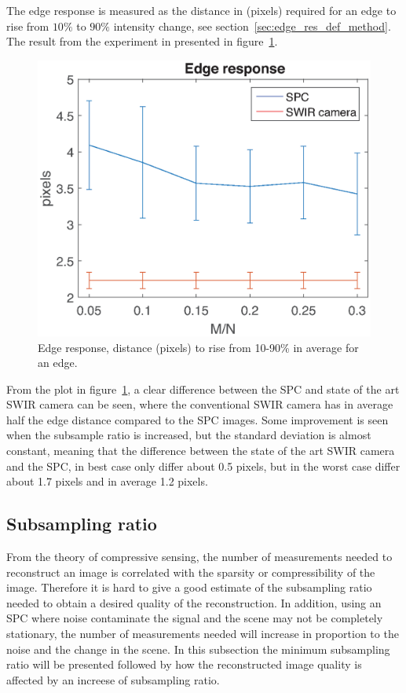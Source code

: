 The edge response is measured as the distance in (pixels) required for an edge to rise from $10\%$ to $90\%$ intensity change, see section~\ref{sec:edge_res_def_method}. The result from the experiment in presented in figure~\ref{fig:rise}. 

\begin{figure}[H]
    \centering
    \includegraphics[width=0.7\linewidth]{result/mtf/Rise10_90.eps}
    \caption{Edge response, distance (pixels) to rise from 10-90\% in average for an edge.}
    \label{fig:rise}
\end{figure}

From the plot in figure~\ref{fig:rise}, a clear difference between the SPC and state of the art SWIR camera can be seen, where the conventional SWIR camera has in average half the edge distance compared to the SPC images. Some improvement is seen when the subsample ratio is increased, but the standard deviation is almost constant, meaning that the difference between the state of the art SWIR camera and the SPC, in best case only differ about 0.5 pixels, but in the worst case differ about 1.7 pixels and in average 1.2 pixels.

\subsection{Subsampling ratio}
\label{sec:measurements}
From the theory of compressive sensing, the number of measurements needed to reconstruct an image is correlated with the sparsity or compressibility of the image. Therefore it is hard to give a good estimate of the subsampling ratio needed to obtain a desired quality of the reconstruction. In addition, using an SPC where noise contaminate the signal and the scene may not be completely stationary, the number of measurements needed will increase in proportion to the noise and the change in the scene. In this subsection the minimum subsampling ratio will be presented followed by how the reconstructed image quality is affected by an increese of subsampling ratio.\\[0.1in]


